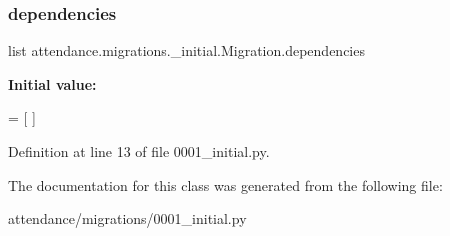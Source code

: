 \subsubsection{\texorpdfstring{dependencies}{dependencies}}
{\footnotesize\ttfamily list attendance.\+migrations.\+\_\+initial.\+Migration.\+dependencies\hspace{0.3cm}{\ttfamily [static]}}

{\bfseries Initial value\+:}
\begin{DoxyCode}
=  [
    ]
\end{DoxyCode}


Definition at line 13 of file 0001\+\_\+initial.\+py.



The documentation for this class was generated from the following file\+:\begin{DoxyCompactItemize}
\item 
attendance/migrations/0001\+\_\+initial.\+py\end{DoxyCompactItemize}
